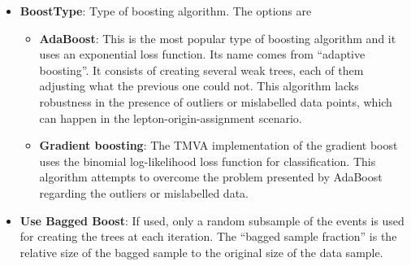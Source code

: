 \begin{itemize}
	\item \textbf{BoostType}: Type of boosting algorithm. The options are
		\begin{itemize}
			\item \textbf{AdaBoost}: This is the most popular type of boosting algorithm and it
				uses an exponential loss function. Its name comes from ``adaptive boosting''.
				It consists of creating several weak trees, each of them adjusting what the previous one
				could not. This algorithm lacks robustness in the presence of outliers or mislabelled data points,
				which can happen in the lepton-origin-assignment scenario.
			\item \textbf{Gradient boosting}: The TMVA implementation of the gradient boost
				 uses the binomial log-likelihood loss function for classification. This algorithm attempts
				 to overcome the problem presented by AdaBoost regarding the outliers or mislabelled data.
		\end{itemize}
		
		
	
		
		
		
	\item \textbf{Use Bagged Boost}: If used, only a random subsample of the events 
		is used for creating the trees at each iteration. The ``bagged sample fraction''
		is the relative size of the bagged sample to the original size of the data sample.
	

\end{itemize}
